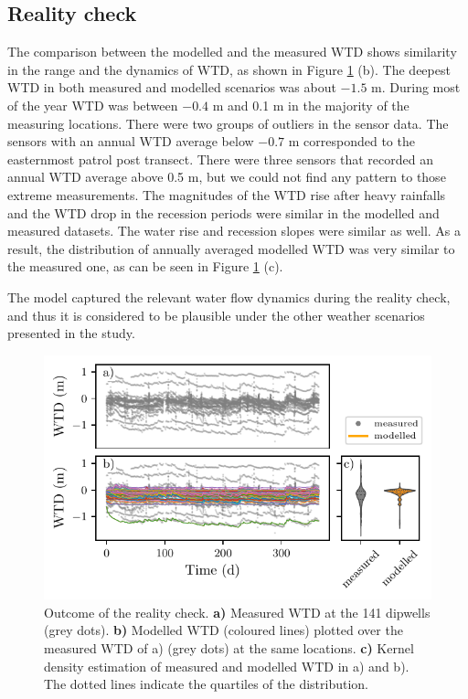 \documentclass[bg, manuscript]{copernicus}
\begin{document}
\subsection{Reality check}
The comparison between the modelled and the measured WTD shows similarity in the range and  the dynamics of WTD, as shown in Figure \ref{fig:modelled_vs_measured} (b).
The deepest WTD in both measured and modelled scenarios was about $-1.5$ \unit{m}.
During most of the year WTD was between $-0.4$ \unit{m} and 0.1 \unit{m} in the majority of the measuring locations.
There were two groups of outliers in the sensor data.
The sensors with an annual WTD average below $-0.7$ \unit{m}  corresponded to the easternmost patrol post transect.
There were three sensors that recorded an annual WTD average above 0.5 \unit{m}, but we could not find any pattern to those extreme measurements.
The magnitudes of the WTD rise after heavy rainfalls and the WTD drop in the recession periods were similar in the modelled and measured datasets.
The water rise and recession slopes were similar as well.
As a result, the distribution of annually averaged modelled WTD was very similar to the measured one, as can be seen in Figure \ref{fig:modelled_vs_measured} (c).

The model captured the relevant water flow dynamics during the reality check, and thus it is considered to be plausible under the other weather scenarios presented in the study.



\begin{figure}[t]
\includegraphics[width=12 cm]{figs/reality_check.pdf}
\caption{Outcome of the reality check. \textbf{a)} Measured WTD at the 141 dipwells (grey dots). \textbf{b)} Modelled WTD (coloured lines) plotted over the measured WTD of a) (grey dots) at the same locations. \textbf{c)} Kernel density estimation of measured and modelled WTD in a) and b). The dotted lines indicate the quartiles of the distribution.}
\label{fig:modelled_vs_measured}
\end{figure}   
\end{document}
